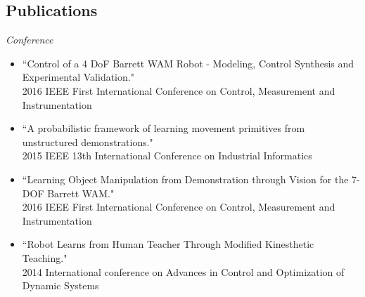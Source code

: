 \documentclass[margin,line]{resume}
\begin{document}
\begin{resume}


      \section{\mysidestyle Publications }
      \emph{Conference}
      \begin{itemize}
        \item ``Control of a 4 DoF Barrett WAM Robot - Modeling, Control Synthesis and Experimental Validation."\\2016 IEEE First International Conference on Control, Measurement and Instrumentation
        \item ``A probabilistic framework of learning movement primitives from unstructured demonstrations."\\2015 IEEE 13th International Conference on Industrial Informatics
        \item ``Learning Object Manipulation from Demonstration through Vision for the 7-DOF Barrett WAM."\\2016 IEEE First International Conference on Control, Measurement and Instrumentation
        \item ``Robot Learns from Human Teacher Through Modified Kinesthetic Teaching."\\2014 International conference on Advances in Control and Optimization of Dynamic Systems
      \end{itemize}
      
      

	
     
         


\end{resume}
\end{document}
